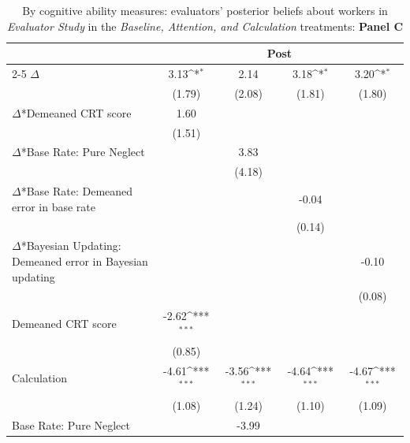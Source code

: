 \begin{table}[htbp]\centering
\def\sym#1{\ifmmode^{#1}\else\(^{#1}\)\fi}
\caption{By cognitive ability measures: evaluators' posterior beliefs about workers in \textit{Evaluator Study} in the \textit{Baseline, Attention, and Calculation} treatments: \textbf{Panel C}}
\begin{tabular}{l*{4}{c}}
\hline\hline
                &\multicolumn{4}{c}{Post}                                                   \\\cmidrule(lr){2-5}
\hline
$\Delta$        &     3.13\sym{*}  &     2.14         &     3.18\sym{*}  &     3.20\sym{*}  \\
                &   (1.79)         &   (2.08)         &   (1.81)         &   (1.80)         \\
$\Delta$*Demeaned CRT score&     1.60         &                  &                  &                  \\
                &   (1.51)         &                  &                  &                  \\
$\Delta$*Base Rate: Pure Neglect&                  &     3.83         &                  &                  \\
                &                  &   (4.18)         &                  &                  \\
$\Delta$*Base Rate: Demeaned error in base rate&                  &                  &    -0.04         &                  \\
                &                  &                  &   (0.14)         &                  \\
$\Delta$*Bayesian Updating: Demeaned error in Bayesian updating&                  &                  &                  &    -0.10         \\
                &                  &                  &                  &   (0.08)         \\
Demeaned CRT score&    -2.62\sym{***}&                  &                  &                  \\
                &   (0.85)         &                  &                  &                  \\
Calculation     &    -4.61\sym{***}&    -3.56\sym{***}&    -4.64\sym{***}&    -4.67\sym{***}\\
                &   (1.08)         &   (1.24)         &   (1.10)         &   (1.09)         \\
Base Rate: Pure Neglect&                  &    -3.99         &                  &                  \\

\end{tabular}
\end{table}
